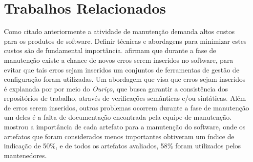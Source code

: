 \chapter{Trabalhos Relacionados}\label{trabalhorel}
Como citado anteriormente a atividade de manutenção demanda altos custos para os produtos de software. Definir técnicas e abordagens para minimizar estes custos são de fundamental importância.  afirmam que durante a fase de manutenção existe a chance de novos erros serem inseridos no software, para evitar que tais erros sejam inseridos um conjuntos de ferramentas de gestão de configuração foram utilizadas. Um abordagem que visa que erros sejam inseridos é explanada por  por meio do \textit{Ouriço}, que busca garantir a consistência dos repositórios de trabalho, através de verificações semânticas e/ou sintáticas.	Além de erros serem inseridos, outros problemas ocorrem durante a fase de manutenção um deles é a falta de documentação encontrada pela equipe de manutenção.  mostrou a importância de cada artefato para a manutenção do software, onde os artefatos que foram considerados menos importantes obtiveram um índice de indicação de 50\%, e de todos os artefatos avaliados, 58\% foram utilizados pelos mantenedores.
